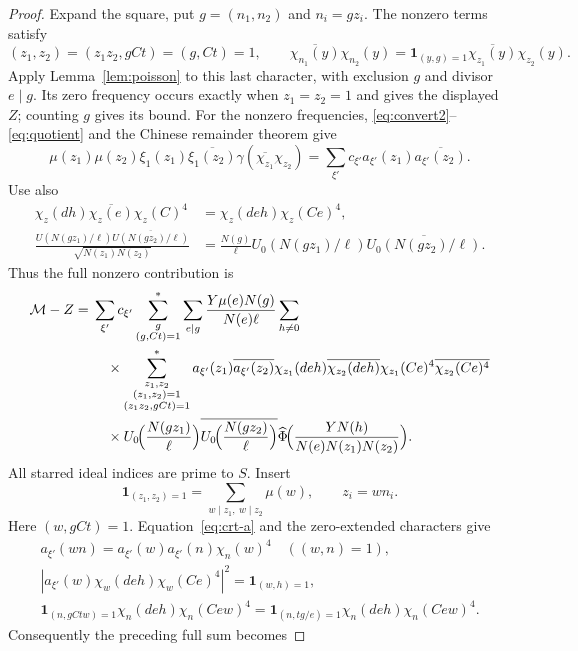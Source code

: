 \documentclass[11pt,a4paper]{article}
\numberwithin{equation}{section}
\numberwithin{figure}{section}
\theoremstyle{definition}
\theoremstyle{remark}
\newcommand{\ind}{\mathbf1}
\begin{document}
\begin{proof}
Expand the square, put $g=(n_1,n_2)$ and $n_i=gz_i$. The nonzero terms satisfy
\[
 (z_1,z_2)=(z_1z_2,gCt)=(g,Ct)=1,\qquad
 \overline{\chi_{n_1}(y)}\chi_{n_2}(y)
 =\ind_{(y,g)=1}\overline{\chi_{z_1}(y)}\chi_{z_2}(y).
\]
Apply Lemma~\ref{lem:poisson} to this last character, with exclusion
$g$ and divisor $e\mid g$. Its zero frequency occurs exactly when
$z_1=z_2=1$ and gives the displayed $Z$; counting $g$ gives its bound.
For the nonzero frequencies, \eqref{eq:convert2}--\eqref{eq:quotient}
and the Chinese remainder theorem give
\[
 \mu(z_1)\mu(z_2)\xi_1(z_1)\overline{\xi_1(z_2)}
 \gamma(\overline{\chi_{z_1}}\chi_{z_2}) =\sum_{\xi'}c_{\xi'}a_{\xi'}(z_1)\overline{a_{\xi'}(z_2)}.
\]
Use also
\[
 \begin{aligned}
 \chi_z(dh)\overline{\chi_z(e)}\chi_z(C)^4
 &=\chi_z(deh)\chi_z(Ce)^4,\\
 \frac{U(N(gz_1)/\ell)\overline{U(N(gz_2)/\ell)}}
      {\sqrt{N(z_1)N(z_2)}}
 &=\frac{N(g)}\ell U_0(N(gz_1)/\ell)\overline{U_0(N(gz_2)/\ell)}.
 \end{aligned}
\]
Thus the full nonzero contribution is
\[
 \begin{aligned}
 \mathcal M-Z={}&\sum_{\xi'}c_{\xi'}
 \sum_{\substack{g\\(g,Ct)=1}}^*\sum_{e\mid g}
 \frac{Y\mu(e)N(g)}{N(e)\ell}\sum_{h\ne0}\\
 &\quad\times\sum_{\substack{z_1,z_2\\(z_1,z_2)=1\\(z_1z_2,gCt)=1}}^*
 a_{\xi'}(z_1)\overline{a_{\xi'}(z_2)} \chi_{z_1}(deh)\overline{\chi_{z_2}(deh)}
 \chi_{z_1}(Ce)^4\overline{\chi_{z_2}(Ce)^4}\\
 &\quad\times
 U_0\!\Bigl(\frac{N(gz_1)}\ell\Bigr)
 \overline{U_0\!\Bigl(\frac{N(gz_2)}\ell\Bigr)}
 \widehat\Phi\!\Bigl(\frac{YN(h)}{N(e)N(z_1)N(z_2)}\Bigr).
 \end{aligned}
\]
All starred ideal indices are prime to $S$. Insert
\[
 \ind_{(z_1,z_2)=1}=\sum_{w\mid z_1,\ w\mid z_2}\mu(w),
 \qquad z_i=wn_i.
\]
Here $(w,gCt)=1$. Equation~\eqref{eq:crt-a} and the zero-extended characters give
\[
 \begin{gathered}
 a_{\xi'}(wn)=a_{\xi'}(w)a_{\xi'}(n)\chi_n(w)^4
       \quad((w,n)=1),\\
 |a_{\xi'}(w)\chi_w(deh)\chi_w(Ce)^4|^2=\ind_{(w,h)=1},\\
 \ind_{(n,gCtw)=1}\chi_n(deh)\chi_n(Cew)^4
 =\ind_{(n,tg/e)=1}\chi_n(deh)\chi_n(Cew)^4.
 \end{gathered}
\]
Consequently the preceding full sum becomes

\end{proof}
\end{document}

